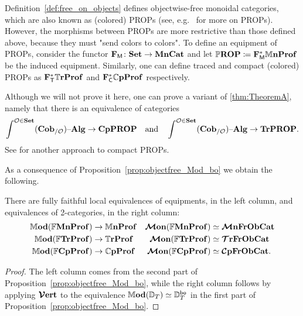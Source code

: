 \documentclass[11pt,oneside,article]{memoir}
\begin{document}
\begin{remark}
	\label{rem:PROP}
  Definition~\ref{def:free_on_objects} defines objectwise-free monoidal categories, which are also known as (colored) PROPs (see, e.g.\ \cite{HackneyRobertson} for more on PROPs). However, the morphisms between PROPs are more restrictive than those defined above, because they must "send colors to colors". To define an equipment of PROPs, consider the functor $\mathbf{F}_{\mathsf{M}}\colon\mathbf{Set}\to\mathbf{MnCat}$ and let $\mathbb{P}\mathbf{ROP}\coloneq\mathbf{F}_{\mathsf{M}}^*\mathbb{M}\mathbf{nProf}$ be the induced equipment. Similarly, one can define traced and compact (colored) PROPs as $\mathbf{F}_{\mathsf{T}}^*\mathbb{T}\mathbf{rProf}$ and $\mathbf{F}_{\mathsf{C}}^*\mathbb{C}\mathbf{pProf}$ respectively. 
  
  Although we will not prove it here, one can prove a variant of \ref{thm:TheoremA}, namely that there is an equivalence of categories
  \begin{equation*}
     \int^{\mathcal{O}\in\mathbf{Set}}(\mathbf{Cob}_{/\mathcal{O}}){\text \textendash}\mathbf{Alg} \to \mathbf{CpPROP}\quad\text{and}\quad\int^{\mathcal{O}\in\mathbf{Set}}(\mathbf{Cob}_{/\mathcal{O}}){\text \textendash}\mathbf{Alg} \to \mathbf{TrPROP}.
  \end{equation*}
  See \cite{JoyalKock} for another approach to compact PROPs.
\end{remark}


As a consequence of Proposition~\ref{prop:objectfree_Mod_bo} we obtain the following.
\begin{corollary}
      \label{cor:TrCat_ObjectFree}
   There are fully faithful local equivalences of equipments, in the left column, and equivalences
   of 2-categories, in the right column:
   \begin{align*}
      \mathbb{M}\mathbf{od}(\mathbb{F}\mathbf{MnProf})  &\to \mathbb{M}\mathbf{nProf} &\bm{\mathcal{M}}\mathbf{on}(\mathbb{F}\mathbf{MnProf})&\simeq\bm{\mathcal{M}}\mathbf{nFrObCat}\\
      \mathbb{M}\mathbf{od}(\mathbb{F}\mathbf{TrProf})   &\to \mathbb{T}\mathbf{rProf}  &\bm{\mathcal{M}}\mathbf{on}(\mathbb{F}\mathbf{TrProf})&\simeq\bm{\mathcal{T}}\mathbf{rFrObCat}\\
      \mathbb{M}\mathbf{od}(\mathbb{F}\mathbf{CpProf}) &\to \mathbb{C}\mathbf{pProf} &\bm{\mathcal{M}}\mathbf{on}(\mathbb{F}\mathbf{CpProf})&\simeq\bm{\mathcal{C}}\mathbf{pFrObCat}.
   \end{align*}
\end{corollary}
\begin{proof}
   The left column comes from the second part of Proposition~\ref{prop:objectfree_Mod_bo}, while
   the right column follows by applying $\bm{\mathcal{V}}\mathbf{ert}$ to the equivalence
   $\mathbb{M}\mathbf{od}(\mathbb{D}_T)\simeq\mathbb{D}_T^{\mathsf{bo}}$ in the first part of
   Proposition~\ref{prop:objectfree_Mod_bo}.
\end{proof}
\end{document}
